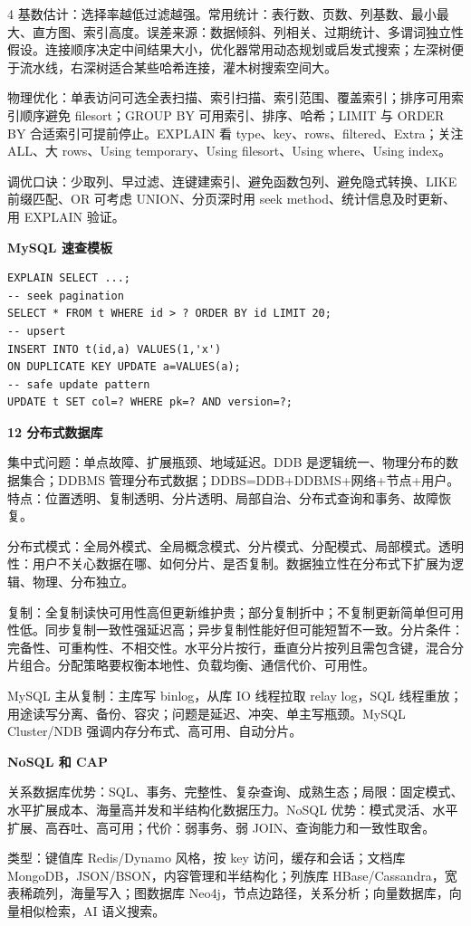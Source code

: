 \documentclass[UTF8]{ctexart}
\newcommand{\blk}[1]{\vspace{0.8pt}\noindent\colorbox{black!10}{\parbox{\dimexpr\linewidth-2\fboxsep}{\bfseries #1}}\vspace{0.6pt}}
\begin{document}
\begin{multicols*}{4}
基数估计：选择率越低过滤越强。常用统计：表行数、页数、列基数、最小最大、直方图、索引高度。误差来源：数据倾斜、列相关、过期统计、多谓词独立性假设。连接顺序决定中间结果大小，优化器常用动态规划或启发式搜索；左深树便于流水线，右深树适合某些哈希连接，灌木树搜索空间大。

物理优化：单表访问可选全表扫描、索引扫描、索引范围、覆盖索引；排序可用索引顺序避免 filesort；GROUP BY 可用索引、排序、哈希；LIMIT 与 ORDER BY 合适索引可提前停止。EXPLAIN 看 type、key、rows、filtered、Extra；关注 ALL、大 rows、Using temporary、Using filesort、Using where、Using index。

调优口诀：少取列、早过滤、连键建索引、避免函数包列、避免隐式转换、LIKE 前缀匹配、OR 可考虑 UNION、分页深时用 seek method、统计信息及时更新、用 EXPLAIN 验证。

\blk{MySQL 速查模板}
\begin{lstlisting}
EXPLAIN SELECT ...;
-- seek pagination
SELECT * FROM t WHERE id > ? ORDER BY id LIMIT 20;
-- upsert
INSERT INTO t(id,a) VALUES(1,'x')
ON DUPLICATE KEY UPDATE a=VALUES(a);
-- safe update pattern
UPDATE t SET col=? WHERE pk=? AND version=?;
\end{lstlisting}

\blk{12 分布式数据库}
集中式问题：单点故障、扩展瓶颈、地域延迟。DDB 是逻辑统一、物理分布的数据集合；DDBMS 管理分布式数据；DDBS=DDB+DDBMS+网络+节点+用户。特点：位置透明、复制透明、分片透明、局部自治、分布式查询和事务、故障恢复。

分布式模式：全局外模式、全局概念模式、分片模式、分配模式、局部模式。透明性：用户不关心数据在哪、如何分片、是否复制。数据独立性在分布式下扩展为逻辑、物理、分布独立。

复制：全复制读快可用性高但更新维护贵；部分复制折中；不复制更新简单但可用性低。同步复制一致性强延迟高；异步复制性能好但可能短暂不一致。分片条件：完备性、可重构性、不相交性。水平分片按行，垂直分片按列且需包含键，混合分片组合。分配策略要权衡本地性、负载均衡、通信代价、可用性。

MySQL 主从复制：主库写 binlog，从库 IO 线程拉取 relay log，SQL 线程重放；用途读写分离、备份、容灾；问题是延迟、冲突、单主写瓶颈。MySQL Cluster/NDB 强调内存分布式、高可用、自动分片。

\blk{NoSQL 和 CAP}
关系数据库优势：SQL、事务、完整性、复杂查询、成熟生态；局限：固定模式、水平扩展成本、海量高并发和半结构化数据压力。NoSQL 优势：模式灵活、水平扩展、高吞吐、高可用；代价：弱事务、弱 JOIN、查询能力和一致性取舍。

类型：键值库 Redis/Dynamo 风格，按 key 访问，缓存和会话；文档库 MongoDB，JSON/BSON，内容管理和半结构化；列族库 HBase/Cassandra，宽表稀疏列，海量写入；图数据库 Neo4j，节点边路径，关系分析；向量数据库，向量相似检索，AI 语义搜索。


\end{multicols*}
\end{document}
